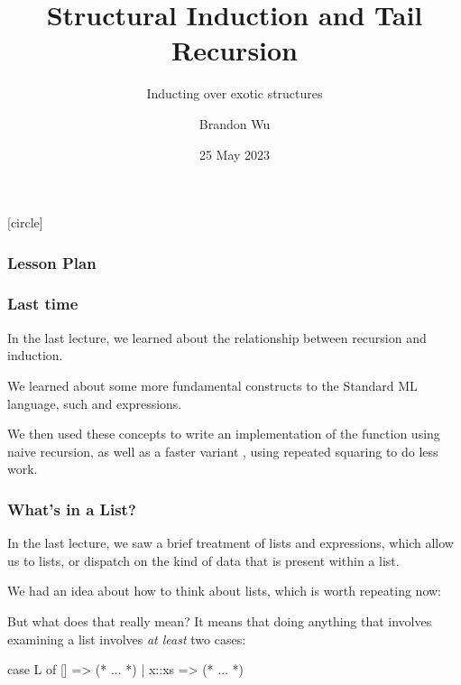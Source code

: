 \documentclass[aspectratio=169]{beamer}
\title{Structural Induction and Tail Recursion} %
\subtitle{Inducting over exotic structures} %
\date{25 May 2023} %
\author{Brandon Wu} %
\newif\ifcolorlambda
\begin{document}
\ifweb
\renewcommand{\pause}{}
\fi

[circle]

{
\begin{frame}[plain]
\colorlambdatrue
\titlepage
\end{frame}
}

\begin{frame}[fragile]
\frametitle{Lesson Plan}

\tableofcontents
\end{frame}

\begin{frame}[fragile]
  \frametitle{Last time}

  In the last lecture, we learned about the relationship between recursion 
  and induction. 

  \pause
  \vspace{\fill}
  
  We learned about some more fundamental constructs to the Standard ML language, such
   and  expressions. 
  
  \pause
  \vspace{\fill}

  We then used these concepts to write an implementation of the  function
  using naive recursion, as well as a faster variant , using
  repeated squaring to do less work. 
\end{frame}


\begin{frame}[fragile]
  \frametitle{What's in a List?}

  In the last lecture, we saw a brief treatment of lists and 
  expressions, which allow us to  lists, or dispatch
  on the kind of data that is present within a list. 

  \pause
  \vspace{\fill}

  We had an idea about how to think about lists, which is worth repeating now:

  \pause
  \vspace{5pt}


  \pause
  \vspace{\fill}

  But what does that really mean? It means that doing anything that involves
  examining a list involves \textit{at least} two cases:

  \begin{codeblock}
    case L of
      [] => (* ... *)
    | x::xs => (* ... *) 
  \end{codeblock}
\end{frame}
\end{document}
